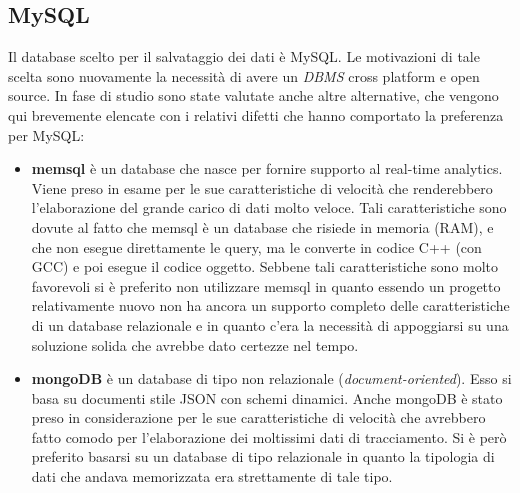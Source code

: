 {\subsection{MySQL}
Il database scelto per il salvataggio dei dati è MySQL. Le motivazioni di tale scelta sono nuovamente la necessità di avere un \textit{DBMS} cross platform e open source. In fase di studio sono state valutate anche altre alternative, che vengono qui brevemente elencate con i relativi difetti che hanno comportato la preferenza per MySQL:
\begin{itemize}

	\item \textbf{memsql} è un database che nasce per fornire supporto al real-time analytics. Viene preso in esame per le sue caratteristiche di velocità che renderebbero l'elaborazione del grande carico di dati molto veloce. Tali caratteristiche sono dovute al fatto che memsql è un database che risiede in memoria (RAM), e che non esegue direttamente le query, ma le converte in codice C++ (con GCC) e poi esegue il codice oggetto. Sebbene tali caratteristiche sono molto favorevoli si è preferito non utilizzare memsql in quanto essendo un progetto relativamente nuovo non ha ancora un supporto completo delle caratteristiche di un database relazionale e in quanto c'era la necessità di appoggiarsi su una soluzione solida che avrebbe dato certezze nel tempo.
	
	\item \textbf{mongoDB} è un database di tipo non relazionale (\textit{document-oriented}). Esso si basa su documenti stile JSON con schemi dinamici. Anche mongoDB è stato preso in considerazione per le sue caratteristiche di velocità che avrebbero fatto comodo per l'elaborazione dei moltissimi dati di tracciamento. Si è però preferito basarsi su un database di tipo relazionale in quanto la tipologia di dati che andava memorizzata era strettamente di tale tipo.
\end{itemize}



}
